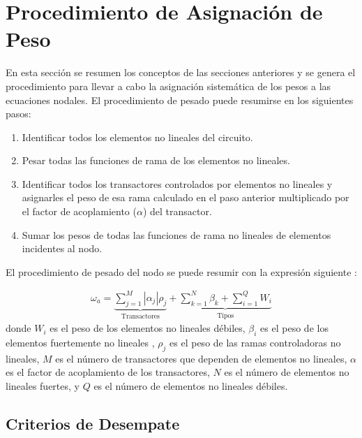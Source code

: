 \documentclass[conference,letterpaper,onecolumn]{IEEEtran}
\begin{document}
\section{Procedimiento de Asignaci\'on de Peso}

En esta secci\'on se resumen los conceptos de las secciones
anteriores y se genera el procedimiento para llevar a cabo la
asignaci\'on sistem\'atica de los pesos a las ecuaciones nodales. 
El procedimiento de pesado puede resumirse en los siguientes pasos:
\begin{enumerate}
\item Identificar todos los elementos no lineales del circuito.
\item Pesar todas las funciones de rama de los elementos no lineales.
\item Identificar todos los transactores controlados por elementos no
lineales y asignarles el peso de esa rama calculado en el paso anterior
multiplicado por el factor de acoplamiento ($\alpha$) del transactor.
\item Sumar los pesos de todas las funciones de rama no lineales
de elementos incidentes al nodo.
\end{enumerate}


El procedimiento de pesado del nodo se puede resumir con la expresi\'on
siguiente \cite{homo_ICECS,homo_SMACD}:

\begin{equation}
\begin{array}{l}
\omega_a=\underbrace{\sum _{j=1}^{M}{|\alpha_j|\rho_j}}_{\mbox{Transactores}} + \underbrace{\sum _{k=1}^{N}{\beta_k}+\sum _{i=1}^{Q}{W_i}}_{\mbox{Tipos}}
\end{array}
\end{equation}
donde $W_i$ es el peso de los elementos no lineales d\'ebiles, $\beta_i$ es el
peso de los elementos fuertemente no lineales ,
$\rho_j$ es el peso de las ramas controladoras no lineales,
$M$ es el n\'umero de transactores que dependen de elementos no lineales,
$\alpha$ es el factor de acoplamiento de los transactores,
$N$ es el n\'umero de elementos no lineales fuertes,
y
$Q$ es el n\'umero de elementos no lineales d\'ebiles.

\subsection{Criterios de Desempate}
\end{document}
